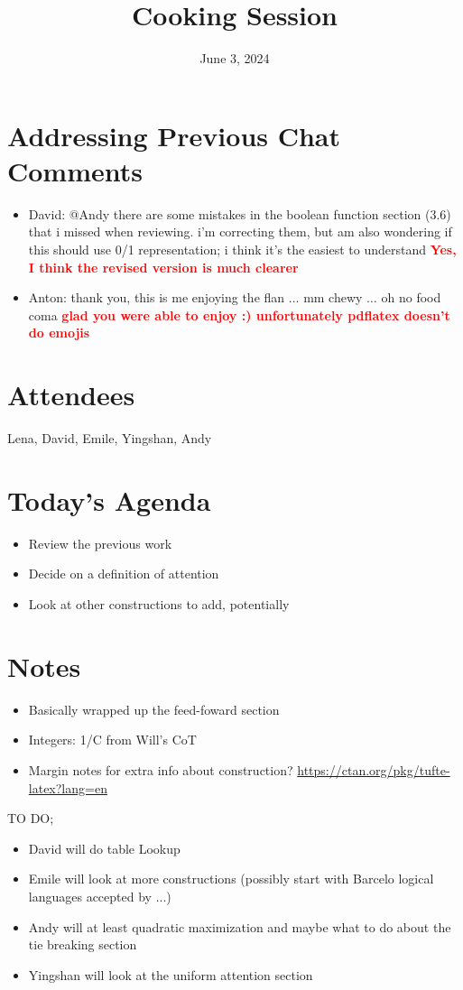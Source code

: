 \documentclass{article}
\title{Cooking Session}
\date{June 3, 2024}
\newcommand{\response}[1]{{\textcolor{red}{\textbf{#1}}}}
\begin{document}
\maketitle
\section{Addressing Previous Chat Comments}
\begin{itemize}
   \item David: @Andy there are some mistakes in the boolean function section (3.6) that i missed when reviewing. i'm correcting them, but am also wondering if this should use 0/1 representation; i think it's the easiest to understand \response{Yes, I think the revised version is much clearer}
   \item Anton: thank you, this is me enjoying the flan $\ldots$ mm chewy $\ldots$ oh no food coma \response{glad you were able to enjoy :) unfortunately pdflatex doesn't do emojis}
\end{itemize}

\section{Attendees}

Lena, David, Emile, Yingshan, Andy

\section{Today's Agenda}
\begin{itemize}
    \item Review the previous work
    \item Decide on a definition of attention
    \item Look at other constructions to add, potentially
\end{itemize}

\section{Notes}
\begin{itemize}
    \item Basically wrapped up the feed-foward section
    \item Integers: 1/C from Will's CoT
    \item Margin notes for extra info about construction? \url{https://ctan.org/pkg/tufte-latex?lang=en}
\end{itemize}

TO DO;
\begin{itemize}
    \item David will do table Lookup
    \item Emile will look at more constructions (possibly start with Barcelo logical languages accepted by ...)
    \item Andy will at least quadratic maximization and maybe what to do about the tie breaking section
    \item Yingshan will look at the uniform attention section
\end{itemize}



\end{document}

